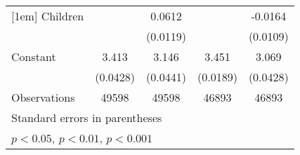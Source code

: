 {\begin{tabular}{l*{4}{c}}
[1em]
Children            &                     &      0.0612\sym{***}&                     &     -0.0164         \\
                    &                     &    (0.0119)         &                     &    (0.0109)         \\
[1em]
Constant            &       3.413\sym{***}&       3.146\sym{***}&       3.451\sym{***}&       3.069\sym{***}\\
                    &    (0.0428)         &    (0.0441)         &    (0.0189)         &    (0.0428)         \\
\hline
Observations        &       49598         &       49598         &       46893         &       46893         \\
\hline\hline
\multicolumn{5}{l}{\footnotesize Standard errors in parentheses}\\
\multicolumn{5}{l}{\footnotesize \sym{*} \(p<0.05\), \sym{**} \(p<0.01\), \sym{***} \(p<0.001\)}\\
\end{tabular}
}
